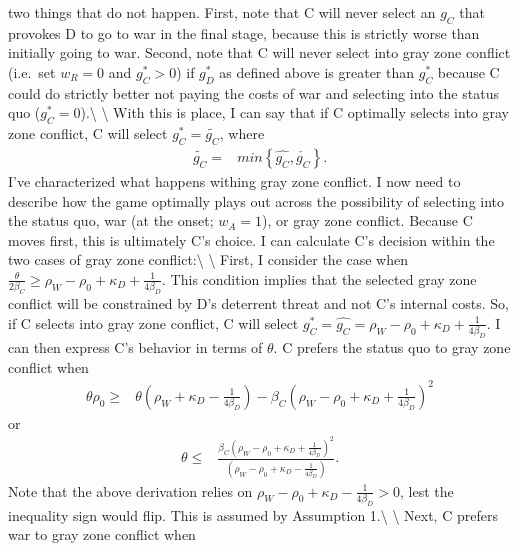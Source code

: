 \documentclass[
]{article}
\begin{document}
two things that do not happen. First, note that C will never select an
\(g_{C}\) that provokes D to go to war in the final stage, because this
is strictly worse than initially going to war. Second, note that C will
never select into gray zone conflict (i.e.~set \(w_{R}=0\) and
\(g_{C}^{*}>0\)) if \(g_{D}^{*}\) as defined above is greater than
\(g_{C}^{*}\) because C could do strictly better not paying the costs of
war and selecting into the status quo (\(g_{C}^{*}=0\)).\textbackslash{}
\textbackslash{} With this is place, I can say that if C optimally
selects into gray zone conflict, C will select
\(g_{C}^{*}=\tilde{g_{C}}\), where \begin{align*}
\tilde{g_{C}}= & min\left\{ \hat{g_{C}},\check{g_{C}}\right\} .
\end{align*} I've characterized what happens withing gray zone conflict.
I now need to describe how the game optimally plays out across the
possibility of selecting into the status quo, war (at the onset;
\(w_{A}=1\)), or gray zone conflict. Because C moves first, this is
ultimately C's choice. I can calculate C's decision within the two cases
of gray zone conflict:\textbackslash{} \textbackslash{} First, I
consider the case when
\(\frac{\theta}{2\beta_{C}}\geq\rho_{W}-\rho_{0}+\kappa_{D}+\frac{1}{4\beta_{D}}\).
This condition implies that the selected gray zone conflict will be
constrained by D's deterrent threat and not C's internal costs. So, if C
selects into gray zone conflict, C will select
\(g_{C}^{*}=\hat{g_{C}}=\rho_{W}-\rho_{0}+\kappa_{D}+\frac{1}{4\beta_{D}}\).
I can then express C's behavior in terms of \(\theta\). C prefers the
status quo to gray zone conflict when \begin{align*}
\theta\rho_{0}\geq & \theta\left(\rho_{W}+\kappa_{D}-\frac{1}{4\beta_{D}}\right)-\beta_{C}\left(\rho_{W}-\rho_{0}+\kappa_{D}+\frac{1}{4\beta_{D}}\right)^{2}
\end{align*} or \begin{align*}
\theta\leq & \frac{\beta_{C}\left(\rho_{W}-\rho_{0}+\kappa_{D}+\frac{1}{4\beta_{D}}\right)^{2}}{\left(\rho_{W}-\rho_{0}+\kappa_{D}-\frac{1}{4\beta_{D}}\right)}.
\end{align*} Note that the above derivation relies on
\(\rho_{W}-\rho_{0}+\kappa_{D}-\frac{1}{4\beta_{D}}>0\), lest the
inequality sign would flip. This is assumed by Assumption
1.\textbackslash{} \textbackslash{} Next, C prefers war to gray zone
conflict when
\end{document}
